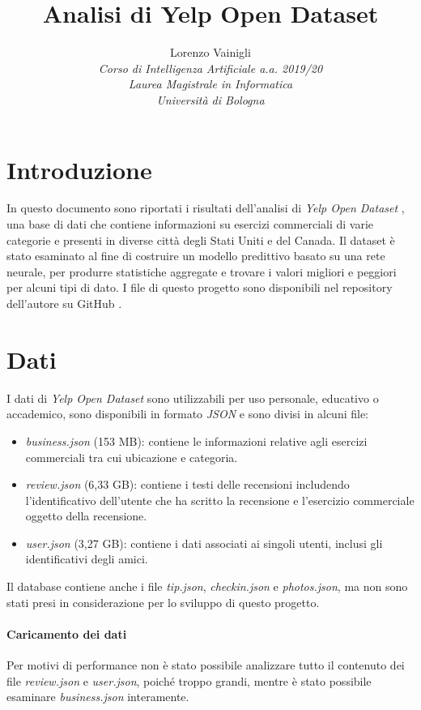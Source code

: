 \documentclass[12pt]{article}
\title{Analisi di Yelp Open Dataset}
\author{
        Lorenzo Vainigli\\
        \textit{\small Corso di Intelligenza Artificiale a.a. 2019/20}\\
        \textit{\small Laurea Magistrale in Informatica}\\
        \textit{\small Università di Bologna}
}
\date{}
\begin{document}
\maketitle
\tableofcontents

\section{Introduzione}
In questo documento sono riportati i risultati dell'analisi di \textit{Yelp Open Dataset} \cite{yelp}, una base di dati che contiene informazioni su esercizi commerciali di varie categorie e presenti in diverse città degli Stati Uniti e del Canada.\newline
Il dataset è stato esaminato al fine di costruire un modello predittivo basato su una rete neurale, per produrre statistiche aggregate e trovare i valori migliori e peggiori per alcuni tipi di dato. \newline
I file di questo progetto sono disponibili nel repository dell'autore su GitHub \cite{repo}. 

\section{Dati}
I dati di \textit{Yelp Open Dataset} sono utilizzabili per uso personale, educativo o accademico, sono disponibili in formato \textit{JSON} e sono divisi in alcuni file:
\begin{itemize}
\item \textit{business.json} (153 MB): contiene le informazioni relative agli esercizi commerciali tra cui ubicazione e categoria.
\item \textit{review.json} (6,33 GB): contiene i testi delle recensioni includendo l'identificativo dell'utente che ha scritto la recensione e l'esercizio commerciale oggetto della recensione.
\item \textit{user.json} (3,27 GB): contiene i dati associati ai singoli utenti, inclusi gli identificativi degli amici.
\end{itemize}
Il database contiene anche i file \textit{tip.json}, \textit{checkin.json} e \textit{photos.json}, ma non sono stati presi in considerazione per lo sviluppo di questo progetto.
\paragraph{Caricamento dei dati}
Per motivi di performance non è stato possibile analizzare tutto il contenuto dei file \textit{review.json} e \textit{user.json}, poiché troppo grandi, mentre è stato possibile esaminare \textit{business.json} interamente.
\end{document}
